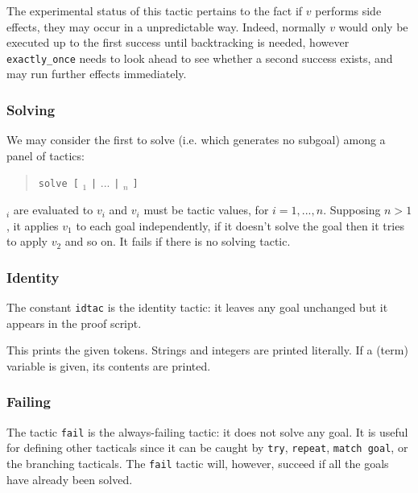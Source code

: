 The experimental status of this tactic pertains to the fact if $v$ performs side effects, they may occur in a unpredictable way. Indeed, normally $v$ would only be executed up to the first success until backtracking is needed, however {\tt exactly\_once} needs to look ahead to see whether a second success exists, and may run further effects immediately.

\ErrMsg {}

\subsubsection[Solving]{Solving
}

We may consider the first to solve (i.e. which generates no subgoal) among a
panel of tactics:
\begin{quote}
{\tt solve [} {\tacexpr}$_1$ {\tt |} $...$ {\tt |} {\tacexpr}$_n$ {\tt ]}
\end{quote}
{\tacexpr}$_i$ are evaluated to $v_i$ and $v_i$ must be tactic values,
for $i=1,...,n$. Supposing $n>1$, it applies $v_1$ to each goal
independently, if it doesn't solve the goal then it tries to apply
$v_2$ and so on. It fails if there is no solving tactic.

\ErrMsg {}

\subsubsection[Identity]{Identity\label{ltac:idtac}
}

The constant {\tt idtac} is the identity tactic: it leaves any goal
unchanged but it appears in the proof script.


This prints the given tokens. Strings and integers are printed
literally. If a (term) variable is given, its contents are printed.


\subsubsection[Failing]{Failing
}

The tactic {\tt fail} is the always-failing tactic: it does not solve
any goal. It is useful for defining other tacticals since it can be
caught by {\tt try}, {\tt repeat}, {\tt match goal}, or the branching
tacticals. The {\tt fail} tactic will, however, succeed if all the
goals have already been solved.

